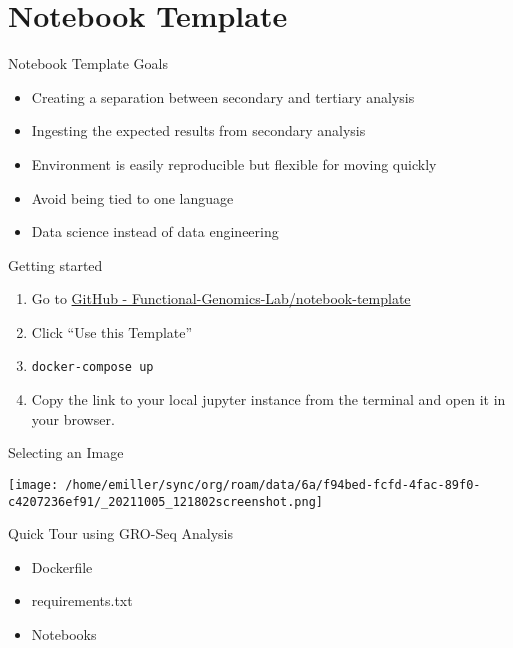 \documentclass[bigger]{beamer}
\begin{document}
\section{Notebook Template}
\label{sec:org5d577ea}
\begin{frame}[label={sec:orgf2ab28c}]{Notebook Template Goals}
\begin{itemize}
\item Creating a separation between secondary and tertiary analysis
\item Ingesting the expected results from secondary analysis
\item Environment is easily reproducible but flexible for moving quickly
\item Avoid being tied to one language
\item Data science instead of data engineering
\end{itemize}
\end{frame}

\begin{frame}[label={sec:orgee19fda},fragile]{Getting started}
 \begin{enumerate}
\item Go to \href{https://github.com/Functional-Genomics-Lab/notebook-template}{\alert{GitHub - Functional-Genomics-Lab/notebook-template}}
\item Click ``Use this Template''
\item \texttt{docker-compose up}
\item Copy the link to your local jupyter instance from the terminal and open it in
your browser.
\end{enumerate}
\end{frame}

\begin{frame}[label={sec:org9499d13}]{Selecting an Image}
\begin{center}
\texttt{[image: /home/emiller/sync/org/roam/data/6a/f94bed-fcfd-4fac-89f0-c4207236ef91/\_20211005\_121802screenshot.png]}
\end{center}
\end{frame}


\begin{frame}[label={sec:org08ab386}]{Quick Tour using GRO-Seq Analysis}
\begin{itemize}
\item Dockerfile
\item requirements.txt
\item Notebooks
\end{itemize}
\end{frame}
\end{document}
